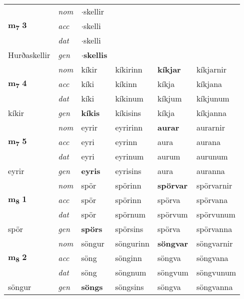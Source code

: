 \begin{longtable}[l]{llllll}
\multirow{3}{*}{{{\textbf{m{\textsubscript{7}}} \Large{\textbf{3}}}}}  & {\footnotesize{{\textit{nom}}}} & $\cdot$skellir &     & \textbf{} &   \\*
 &  {\footnotesize{{\textit{acc}}}} & $\cdot$skelli  &    &   &  \\*
 &  {\footnotesize{{\textit{dat}}}} & $\cdot$skelli &    &  &  \\*
 {\footnotesize{Hurðaskellir}} &   {\footnotesize{{\textit{gen}}}} & \textbf{$\cdot$skellis}  &   &  &  \\
\cmidrule{1-6}


\multirow{3}{*}{{{\textbf{m{\textsubscript{7}}} \Large{\textbf{4}}}}}  & {\footnotesize{{\textit{nom}}}} & kíkir & kíkirinn    & \textbf{kíkjar} & kíkjarnir  \\*
 &  {\footnotesize{{\textit{acc}}}} & kíki  & kíkinn   & kíkja  & kíkjana \\*
 &  {\footnotesize{{\textit{dat}}}} & kíki & kíkinum   & kíkjum & kíkjunum \\*
 {\footnotesize{kíkir}} &   {\footnotesize{{\textit{gen}}}} & \textbf{kíkis}  & kíkisins  & kíkja & kíkjanna \\
\cmidrule{1-6}


\multirow{3}{*}{{{\textbf{m{\textsubscript{7}}} \Large{\textbf{5}}}}}  & {\footnotesize{{\textit{nom}}}} & eyrir & eyririnn    & \textbf{aurar} & aurarnir  \\*
 &  {\footnotesize{{\textit{acc}}}} & eyri  & eyrinn   & aura  & aurana \\*
 &  {\footnotesize{{\textit{dat}}}} & eyri & eyrinum   & aurum & aurunum \\*
 {\footnotesize{eyrir}} &   {\footnotesize{{\textit{gen}}}} & \textbf{eyris}  & eyrisins  & aura & auranna \\
\cmidrule{1-6}


\multirow{3}{*}{{{\textbf{m{\textsubscript{8}}} \Large{\textbf{1}}}}}  & {\footnotesize{{\textit{nom}}}} & spör & spörinn    & \textbf{spörvar} & spörvarnir  \\*
 &  {\footnotesize{{\textit{acc}}}} & spör  & spörinn   & spörva  & spörvana \\*
 &  {\footnotesize{{\textit{dat}}}} & spör & spörnum   & spörvum & spörvunum \\*
 {\footnotesize{spör}} &   {\footnotesize{{\textit{gen}}}} & \textbf{spörs}  & spörsins  & spörva & spörvanna \\
\cmidrule{1-6}


\multirow{3}{*}{{{\textbf{m{\textsubscript{8}}} \Large{\textbf{2}}}}}  & {\footnotesize{{\textit{nom}}}} & söngur & söngurinn    & \textbf{söngvar} & söngvarnir  \\*
 &  {\footnotesize{{\textit{acc}}}} & söng  & sönginn   & söngva  & söngvana \\*
 &  {\footnotesize{{\textit{dat}}}} & söng & söngnum   & söngvum & söngvunum \\*
 {\footnotesize{söngur}} &   {\footnotesize{{\textit{gen}}}} & \textbf{söngs}  & söngsins  & söngva & söngvanna \\
\cmidrule{1-6}



\end{longtable}

